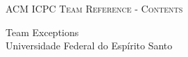 \documentclass[a4paper]{amsart}
\begin{document}
  \enlargethispage*{\baselineskip}
  \pagebreak

  \enlargethispage*{\baselineskip}
  \pagebreak

  \enlargethispage*{\baselineskip}
  \pagebreak

  \begin{center}
    \Huge\textsc{ACM ICPC Team Reference - Contents}

    \vspace{0.35cm}

    \huge Team Exceptions \\ Universidade Federal do Espírito Santo

    \vspace{0.35cm}

  \end{center}

  \begin{multicols}{2}
    \tableofcontents
  \end{multicols}
\end{document}
